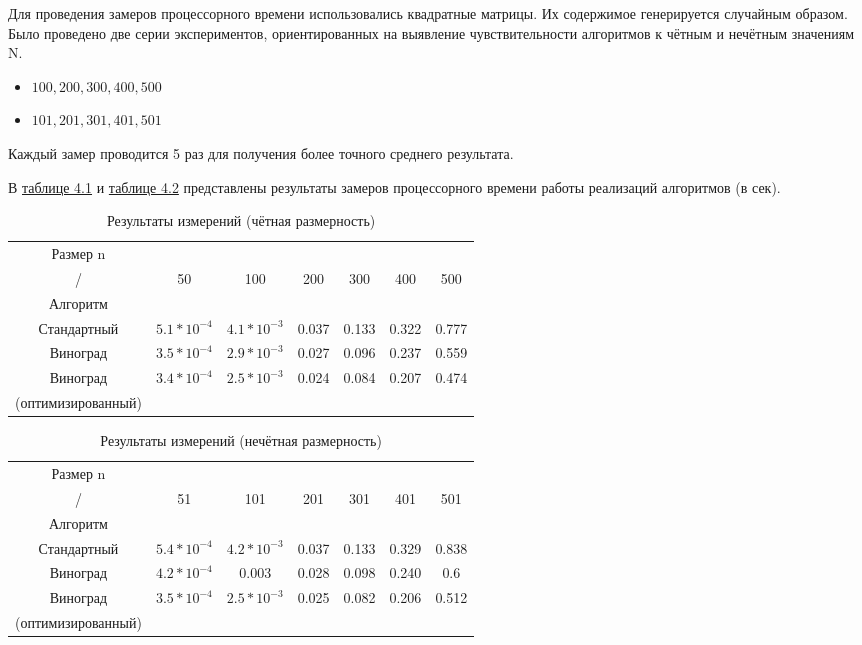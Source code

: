 Для проведения замеров процессорного времени использовались квадратные матрицы. Их содержимое генерируется случайным образом. Было проведено две серии экспериментов, ориентированных на выявление чувствительности алгоритмов к чётным и нечётным значениям N.
\begin{itemize}
	\item ${100, 200, 300, 400, 500}$
	\item ${101, 201, 301, 401, 501}$
\end{itemize} 

Каждый замер проводится 5 раз для получения более точного среднего результата.

В \hyperref[table_4_1]{таблице 4.1} и \hyperref[table_4_2]{таблице 4.2} представлены результаты замеров процессорного времени работы реализаций алгоритмов (в сек).

\begin{table}[ph] \label{table_4_1}
	\caption{Результаты измерений (чётная размерность)}
	\centering
	\begin{tabular}{|c|c|c|c|c|c|c|}
		\hline
		Размер n&&&&&&\\
		/    &50 &100 & 200 & 300 & 400 & 500\\
		Алгоритм    &&&&&&\\
		\hline
		Стандартный & $5.1*10^{-4}$ & $4.1*10^{-3}$ & 0.037 & 0.133 & 0.322 & 0.777\\
		\hline
		Виноград & $3.5*10^{-4}$ & $2.9*10^{-3}$ & 0.027 & 0.096 & 0.237 & 0.559\\
		\hline
		Виноград & $3.4*10^{-4}$ & $2.5*10^{-3}$ & 0.024 & 0.084 & 0.207 & 0.474\\
		(оптимизированный) &&&&&&\\
		\hline
	\end{tabular}
\end{table}

\begin{table}[ph] \label{table_4_2}
	\caption{Результаты измерений (нечётная размерность)}
	\centering
	\begin{tabular}{|c|c|c|c|c|c|c|}
		\hline
		Размер n&&&&&&\\
		/    & 51 &101 & 201 & 301 & 401 & 501\\
		Алгоритм    &&&&&&\\
		\hline
		Стандартный & $5.4*10^{-4}$ & $4.2*10^{-3}$ & 0.037 & 0.133 & 0.329 & 0.838\\
		\hline
		Виноград & $4.2*10^{-4}$ & $0.003$ & 0.028 & 0.098 & 0.240 & 0.6\\
		\hline
		Виноград & $3.5*10^{-4}$ & $2.5*10^{-3}$ & 0.025 & 0.082 & 0.206 & 0.512\\
		(оптимизированный) &&&&&&\\
		\hline
	\end{tabular}
\end{table}